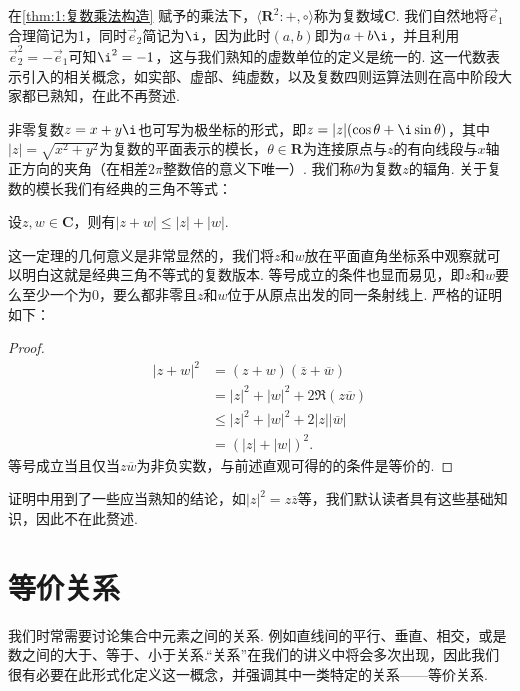 在\autoref{thm:1:复数乘法构造} 赋予的乘法下，$\langle\mathbf{R}^2:+,\circ\rangle$称为复数域$\mathbf{C}$. 我们自然地将$\vec{e}_1$合理简记为1，同时$\vec{e}_2$简记为$\i$，因为此时$(a,b)$即为$a+b\i$，并且利用$\vec{e}_2^2=-\vec{e}_1$可知$\i^2=-1$，这与我们熟知的虚数单位的定义是统一的. 这一代数表示引入的相关概念，如实部、虚部、纯虚数，以及复数四则运算法则在高中阶段大家都已熟知，在此不再赘述.

非零复数$z=x+y\i$也可写为极坐标的形式，即$z=|z|(\cos\theta+\i\sin\theta)$，其中$|z|=\sqrt{x^2+y^2}$为复数的平面表示的模长，$\theta\in\mathbf{R}$为连接原点与$z$的有向线段与$x$轴正方向的夹角（在相差$2\pi$整数倍的意义下唯一）. 我们称$\theta$为复数$z$的辐角. 关于复数的模长我们有经典的三角不等式：
\begin{theorem}
    设$z,w\in\mathbf{C}$，则有$|z+w|\leqslant|z|+|w|$.
\end{theorem}

这一定理的几何意义是非常显然的，我们将$z$和$w$放在平面直角坐标系中观察就可以明白这就是经典三角不等式的复数版本. 等号成立的条件也显而易见，即$z$和$w$要么至少一个为0，要么都非零且$z$和$w$位于从原点出发的同一条射线上. 严格的证明如下：

\begin{proof}
    \begin{align*}
        |z+w|^2 & =(z+w)(\overline{z}+\overline{w})       \\
                & =|z|^2+|w|^2+2\Re(z\overline{w})        \\
                & \leqslant|z|^2+|w|^2+2|z||\overline{w}| \\
                & =(|z|+|w|)^2.
    \end{align*}
    等号成立当且仅当$z\overline{w}$为非负实数，与前述直观可得的的条件是等价的.
\end{proof}

证明中用到了一些应当熟知的结论，如$|z|^2=z\overline{z}$等，我们默认读者具有这些基础知识，因此不在此赘述.

\section{等价关系}

我们时常需要讨论集合中元素之间的关系. 例如直线间的平行、垂直、相交，或是数之间的大于、等于、小于关系.``关系''在我们的讲义中将会多次出现，因此我们很有必要在此形式化定义这一概念，并强调其中一类特定的关系——等价关系.

